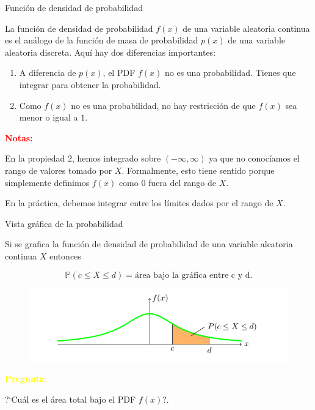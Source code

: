 \documentclass[10pt]{beamer}
\begin{document}
\begin{frame}{Funci\'on de  densidad de probabilidad }
\small{ La funci\'on de densidad de probabilidad $f(x)$ de una variable aleatoria continua es el an\'alogo de la funci\'on de masa de probabilidad $p(x)$ de una variable aleatoria discreta. Aqu\'i hay dos diferencias importantes:

\begin{enumerate}	
	
\item A diferencia de $p(x)$, el PDF $f(x)$ no es una probabilidad. Tienes que integrar  para obtener la  probabilidad. 
\item Como $f(x)$ no es una probabilidad, no hay restricci\'on de que $f(x)$ sea menor o igual a $1$.
\end{enumerate}

\textcolor{red}{\textbf{Notas:}}

En la propiedad 2, hemos integrado sobre $(-\infty, \infty)$ ya que no conoc\'iamos el rango de valores tomado por $X$. Formalmente, esto tiene sentido porque simplemente definimos $f(x)$ como $0$ fuera del rango de $X$. 

En la  pr\'actica, debemos integrar entre los l\'imites dados por el rango de $X$.
}		
\end{frame}

\begin{frame}{Vista gr\'afica de la probabilidad }
\small{ Si se grafica la funci\'on de densidad de probabilidad de una variable aleatoria continua $X$ entonces
	
\[
\mathbb{P}(c \leq X \leq d) = \text{\'area bajo la gr\'afica entre c y d}.
\]

\begin{figure}[ht]
	\centering
	\includegraphics[scale=.4]{G2.png}
\end{figure}

\textcolor{yellow}{\textbf{Pregunta:}}

?`Cu\'al es el \'area total bajo el PDF $f(x)$?.
}

\end{frame}
\end{document}
